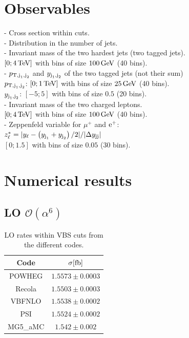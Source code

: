 \documentclass[a4paper,10pt]{report}
\begin{document}
\section{Observables}
- Cross section within cuts. \\
- Distribution in the number of jets. \\
- Invariant mass of the two hardest jets (two tagged jets). \\
$[0; 4\,\text{TeV}]$ with bins of size $100\,\text{GeV}$ (40 bins). \\
- $p_{\text{T},\text{j}_1,\text{j}_2}$ and $y_{\text{j}_1,\text{j}_2}$ of the two tagged jets (not their sum) \\
$p_{\text{T},\text{j}_1,\text{j}_2}$: $[0; 1\,\text{TeV}]$ with bins of size $25\,\text{GeV}$ (40 bins). \\
$y_{\text{j}_1,\text{j}_2}$: $[-5;5]$ with bins of size $0.5$ (20 bins). \\
- Invariant mass of the two charged leptons. \\
$[0; 4\,\text{TeV}]$ with bins of size $100\,\text{GeV}$ (40 bins). \\
- Zeppenfeld variable for $\mu^+$ and $\text{e}^+$: \\
$z^*_\ell = |y_\ell - \left(y_{\text{j}_1}+y_{\text{j}_2} \right)/2|/|\Delta y_{\text{j}\text{j}}|$ \\
$[0;1.5]$ with bins of size $0.05$ (30 bins).

\section{Numerical results}

\subsection{LO $\mathcal{O}\left(\alpha^6\right)$}

\begin{table}[h!]
    \begin{tabular}{c|c}
        Code  &  $\sigma[\rm{fb}]$  \\
        \hline
        \hline
        {\sc POWHEG}  &  $1.5573 \pm 0.0003$ \\
        {\sc Recola}  &  $1.5503 \pm 0.0003$ \\
        {\sc VBFNLO}  &  $1.5538 \pm 0.0002$ \\
        {\sc PSI}     &  $1.5524 \pm 0.0002$ \\
        {\sc MG5\_aMC}&  $1.542 \pm 0.002$   
    \end{tabular}
    \caption{\label{tab:LOrates} LO rates within VBS cuts from the different codes.}
\end{table}
\end{document}
